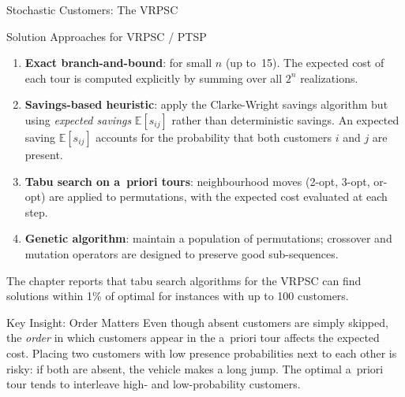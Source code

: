 \documentclass[aspectratio=169,10pt]{beamer}
\begin{document}
\begin{frame}[allowframebreaks]{Stochastic Customers: The VRPSC}
  \framebreak

  \begin{block}{Solution Approaches for VRPSC / PTSP}
    \begin{enumerate}
      \item \textbf{Exact branch-and-bound}: for small $n$ (up to~15).
            The expected cost of each tour is computed explicitly by
            summing over all $2^n$ realizations.

      \item \textbf{Savings-based heuristic}: apply the Clarke-Wright
            savings algorithm but using \emph{expected savings}
            $\mathbb{E}[s_{ij}]$ rather than deterministic savings.
            An expected saving $\mathbb{E}[s_{ij}]$ accounts for the
            probability that both customers $i$ and $j$ are present.

      \item \textbf{Tabu search on a~priori tours}: neighbourhood
            moves (2-opt, 3-opt, or-opt) are applied to permutations,
            with the expected cost evaluated at each step.

      \item \textbf{Genetic algorithm}: maintain a population of
            permutations; crossover and mutation operators are designed
            to preserve good sub-sequences.
    \end{enumerate}
  \end{block}

  The chapter reports that tabu search algorithms for the VRPSC can find
  solutions within 1\% of optimal for instances with up to 100 customers.

  \begin{alertblock}{Key Insight: Order Matters}
    Even though absent customers are simply skipped, the \emph{order}
    in which customers appear in the a~priori tour affects the expected
    cost.  Placing two customers with low presence probabilities next to
    each other is risky: if both are absent, the vehicle makes a long
    jump.  The optimal a~priori tour tends to interleave high- and
    low-probability customers.
  \end{alertblock}

\end{frame}
\end{document}
